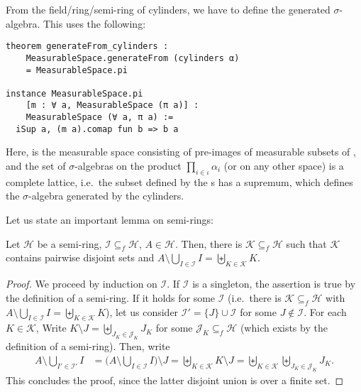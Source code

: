 \documentclass[lean]{DraftAFM}
\begin{document}
From the field/ring/semi-ring of cylinders, we have to define the
generated $\sigma$-algebra. This uses the following:
\begin{verbatim}
theorem generateFrom_cylinders :
    MeasurableSpace.generateFrom (cylinders α)
    = MeasurableSpace.pi

instance MeasurableSpace.pi
    [m : ∀ a, MeasurableSpace (π a)] :
    MeasurableSpace (∀ a, π a) :=
  iSup a, (m a).comap fun b => b a
\end{verbatim}
Here, 
is the measurable space consisting of pre-images of measurable subsets
of , and the set of $\sigma$-algebras on the product
$\prod_{i\in\iota} \alpha_i$ (or on any other space) is a complete
lattice, i.e.\ the subset defined by the s has a
supremum, which defines the $\sigma$-algebra generated by the
cylinders.

Let us state an important lemma on semi-rings:

\begin{lemma}\label{l1}
  Let $\mathcal H$ be a semi-ring, $\mathcal I \subseteq_f \mathcal H$,
  $A \in \mathcal H$. Then, there is $\mathcal K \subseteq_f \mathcal
  H$ such that $\mathcal K$ contains pairwise disjoint sets and $A
  \setminus \bigcup_{I \in \mathcal I} I = \biguplus_{K\in \mathcal K}
  K$.
\end{lemma}

\begin{proof}
  We proceed by induction on $\mathcal I$. If $\mathcal I$ is a
  singleton, the assertion is true by the definition of a semi-ring. If
  it holds for some $\mathcal I$ (i.e.\ there is $\mathcal K
  \subseteq_f \mathcal H$ with $A \setminus \bigcup_{I \in \mathcal I}
  I = \biguplus_{K\in \mathcal K} K$), let us consider $\mathcal I' =
  \{J\} \cup \mathcal I$ for some $J \notin \mathcal I$. For each $K
  \in \mathcal K$, Write $K \setminus J = \biguplus_{J_K \in \mathcal
    J_K} J_K$ for some $\mathcal J_K \subseteq_f \mathcal H$ (which
  exists by the definition of a semi-ring). Then, write
  \begin{align*}
    A \setminus \bigcup_{I' \in \mathcal I'} I & = \Big(A \setminus
    \bigcup_{I \in \mathcal I} I\Big) \setminus J = \biguplus_{K\in
      \mathcal K} K \setminus J = \biguplus_{K\in \mathcal K}
    \biguplus_{J_K \in \mathcal J_K} J_K.
  \end{align*}
  This concludes the proof, since the latter disjoint union is over a
  finite set.
\end{proof}
\end{document}
